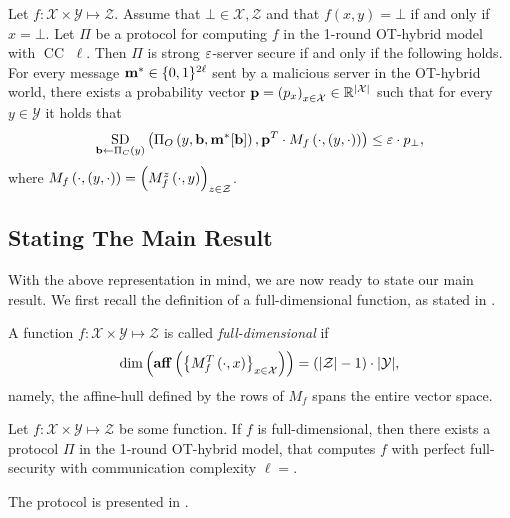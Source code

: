\documentclass{llncs}
\newcommand{\X}{\mathcal{X}}
\newcommand{\Y}{\mathcal{Y}}
\renewcommand{\Z}{\mathcal{Z}}
\newcommand{\affine}[1]{\normalfont{\mathbf{aff}}\of{#1}}
\newcommand{\aff}[1]{\affine{#1}}
\newcommand{\p}{\myvec{p}}
\renewcommand{\b}{\myvec{b}}
\newcommand{\m}{\myvec{m}}
\newcommand{\CC}{\operatorname{CC}}
\renewcommand{\SD}{\operatorname*{SD}}
\begin{document}
\begin{claim}\label{obs-geom-enh-cl}
Let $f:\X\times\Y\mapsto\Z$. Assume that $\bot\in\X,\Z$ and that $f(x,y)=\bot$ if and only if $x=\bot$.	Let $\Pi$ be a protocol for computing $f$ in the 1-round OT-hybrid model with $\CC$ $\ell$. Then $\Pi$ is strong $\varepsilon$-server secure if and only if the following holds. For every message $\m^*\in \{0,1\}^{2\ell}$ sent by a malicious server in the OT-hybrid world, there exists a probability vector $\p=\vect{p_x}_{x\in\X}\in\R^{|\X|}$ such that for every $y\in\Y$ it holds that
	$$\SD_{\myvec{b}\from\Pi_C(y)}\of{\Pi_O\of{y,\b,\m^*[\b]},\p^T\cdot M_f\of{\cdot,(y,\cdot)}}\leq \eps\cdot p_\bot,$$
	where $M_f\of{\cdot,(y,\cdot)}=\vect{M_f^z\of{\cdot,y}}_{z\in\Z}$.%
\end{claim} 

\subsection{Stating The Main Result}
With the above representation in mind, we are now ready to state our main result. We first recall the definition of a full-dimensional function, as stated in \cite{Ash14}.

\begin{definition}
A function $f:\X\times\Y\mapsto\Z$ is called \emph{full-dimensional} if $$\operatorname{dim}\of{\aff{\set{M_f^T\of{\cdot,x}}_{x\in\X}}}=(|\Z|-1)\cdot|\Y|,$$
namely, the affine-hull defined by the rows of $M_f$ spans the entire vector space.
\end{definition}

\begin{theorem}
Let $f:\X\times\Y\mapsto\Z$ be some function. If $f$ is full-dimensional, then there exists a protocol $\Pi$ in the 1-round OT-hybrid model, that computes $f$ with perfect full-security with communication complexity $\ell=$.
\end{theorem}
The protocol is presented in .

\end{document}
